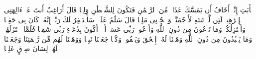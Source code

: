 \stopbuffer
\startbuffer[\q:19:45]
یَٰۤأَبَتِ إِنِّیۤ أَخَافُ أَن یَمَسَّكَ عَذَابࣱ مِّنَ ٱلرَّحۡمَٰنِ فَتَكُونَ لِلشَّیۡطَٰنِ وَلِیࣰّا%
\stopbuffer
\startbuffer[\q:19:46]
قَالَ أَرَاغِبٌ أَنتَ عَنۡ ءَالِهَتِی یَٰۤإِبۡرَٰهِیمُۖ لَئِن لَّمۡ تَنتَهِ لَأَرۡجُمَنَّكَۖ وَٱهۡجُرۡنِی مَلِیࣰّا%
\stopbuffer
\startbuffer[\q:19:47]
قَالَ سَلَٰمٌ عَلَیۡكَۖ سَأَسۡتَغۡفِرُ لَكَ رَبِّیۤۖ إِنَّهُۥ كَانَ بِی حَفِیࣰّا%
\stopbuffer
\startbuffer[\q:19:48]
وَأَعۡتَزِلُكُمۡ وَمَا تَدۡعُونَ مِن دُونِ ٱللَّهِ وَأَدۡعُوا۟ رَبِّی عَسَىٰۤ أَلَّاۤ أَكُونَ بِدُعَاۤءِ رَبِّی شَقِیࣰّا%
\stopbuffer
\startbuffer[\q:19:49]
فَلَمَّا ٱعۡتَزَلَهُمۡ وَمَا یَعۡبُدُونَ مِن دُونِ ٱللَّهِ وَهَبۡنَا لَهُۥۤ إِسۡحَٰقَ وَیَعۡقُوبَۖ وَكُلࣰّا جَعَلۡنَا نَبِیࣰّا%
\stopbuffer
\startbuffer[\q:19:50]
وَوَهَبۡنَا لَهُم مِّن رَّحۡمَتِنَا وَجَعَلۡنَا لَهُمۡ لِسَانَ صِدۡقٍ عَلِیࣰّا%
\stopbuffer
